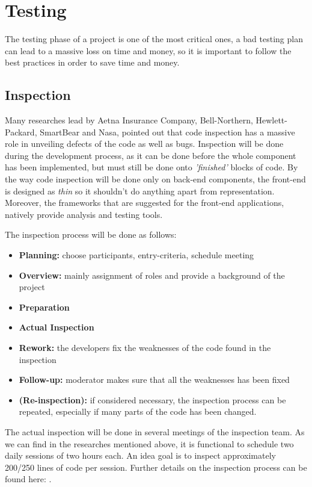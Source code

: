 \section{Testing}
The testing phase of a project is one of the most critical ones, a bad testing
plan can lead to a massive loss on time and money, so it is important to follow
the best practices in order to save time and money.

\subsection{Inspection}
Many researches lead by Aetna Insurance Company, Bell-Northern, Hewlett-Packard,
SmartBear and Nasa, pointed out that code inspection has a massive role in
unveiling defects of the code as well as bugs. Inspection will be done during
the development process, as it can be done before the whole component has been
implemented, but must still be done onto \emph{'finished'} blocks of code. By
the way code inspection will be done only on back-end components, the front-end
is designed as \emph{thin} so it shouldn't do anything apart from
representation. Moreover, the frameworks that are suggested for the front-end
applications, natively provide analysis and testing tools.

The inspection process will be done as follows:
\begin{itemize}
    \item \textbf{Planning:} choose participants, entry-criteria, schedule
        meeting
    \item \textbf{Overview:} mainly assignment of roles and provide a background
        of the project
    \item \textbf{Preparation}
    \item \textbf{Actual Inspection}
    \item \textbf{Rework:} the developers fix the weaknesses of the code found
        in the inspection
    \item \textbf{Follow-up:} moderator makes sure that all the weaknesses has
        been fixed
    \item \textbf{(Re-inspection):} if considered necessary, the inspection
        process can be repeated, especially if many parts of the code has been
        changed.
\end{itemize}

The actual inspection will be done in several meetings of the inspection team.
As we can find in the researches mentioned above, it is functional to schedule
two daily sessions of two hours each. An idea goal is to inspect approximately
200/250 lines of code per session. Further details on the inspection process can
be found here: \cite{smartbear:code-inspection}.

